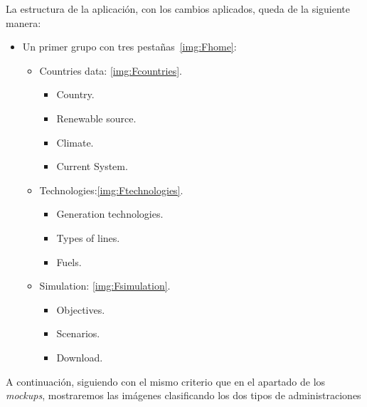 La estructura de la aplicación, con los cambios aplicados, queda de la siguiente manera:

\begin{itemize}
	
	\item Un primer grupo con tres pestañas~\ref{img:Fhome}:
	
	\begin{itemize}
		
		\item Countries data: \ref{img:Fcountries}. 
		
		\begin{itemize}
			
			\item Country.
			\item Renewable source.
			\item Climate.
			\item Current System.
			
		\end{itemize}
		
		\item Technologies:\ref{img:Ftechnologies}.
		
		\begin{itemize}
			
			\item Generation technologies.
			\item Types of lines.
			\item Fuels.
			
		\end{itemize}
		
		\item Simulation: \ref{img:Fsimulation}.
		
		\begin{itemize}
			
			\item Objectives.
			\item Scenarios.
			\item Download.
			
		\end{itemize}
		
	\end{itemize}
	
\end{itemize}

A continuación, siguiendo con el mismo criterio que en el apartado de los \textit{mockups}, mostraremos las imágenes clasificando los dos tipos de administraciones

